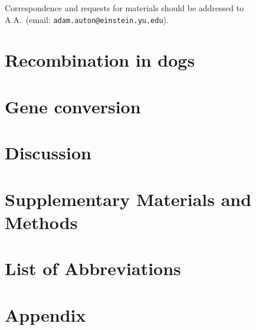 \documentclass[11pt,twoside,openright,letterpaper]{memoir}
\begin{document}
\vspace{0.5cm}
\begin{centering}
    Correspondence and requests for materials should be addressed to \\
    A.A.\ (email: \texttt{adam.auton@einstein.yu.edu}). \\
\end{centering}




\chapter{Recombination in dogs}

\chapter{Gene conversion}

\chapter{Discussion}

\backmatter

\chapter{Supplementary Materials and Methods}

\chapter{List of Abbreviations}

\chapter{Appendix}
%
%


\end{document}
